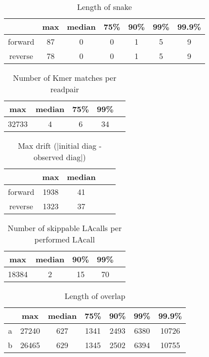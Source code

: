\documentclass[../main/thesis.tex]{subfiles}
\begin{document}
\begin{table}[h]
\caption{Length of snake}
\centering
\vspace{-5pt}
\begin{tabular}{c|c c c c c c}
& max & median & 75\% & 90\% & 99\% & 99.9\% \\ \hline
forward & 87 & 0 & 0 & 1 & 5 & 9 \\
reverse & 78 & 0 & 0 & 1 & 5 & 9 \\
\end{tabular}
\end{table}

\begin{table}[h]
\caption{Number of Kmer matches per readpair}
\centering
\vspace{-5pt}
\begin{tabular}{c|c c c c}
max & median & 75\% & 99\% \\ \hline
32733 & 4 & 6 & 34 \\
\end{tabular}
\end{table}

\begin{table}[h]
\caption{Max drift (|initial diag - observed diag|)}
\centering
\vspace{-5pt}
\begin{tabular}{c|c c c c}
& max & median \\ \hline
forward & 1938 & 41 \\
reverse & 1323 & 37 \\
\end{tabular}
\end{table}

\begin{table}[h]
\caption{Number of skippable LAcalls per performed LAcall}
\centering
\vspace{-5pt}
\begin{tabular}{c|c c c c}
max & median & 90\% & 99\% \\ \hline
18384 & 2 & 15 & 70 \\
\end{tabular}
\end{table}

\begin{table}[h]
\caption{Length of overlap}
\centering
\vspace{-5pt}
\begin{tabular}{c|c c c c c c}
& max & median & 75\% & 90\% & 99\% & 99.9\% \\ \hline
a & 27240 & 627 & 1341 & 2493 & 6380 & 10726 \\
b & 26465 & 629 & 1345 & 2502 & 6394 & 10755 \\
\end{tabular}
\end{table}
\end{document}
